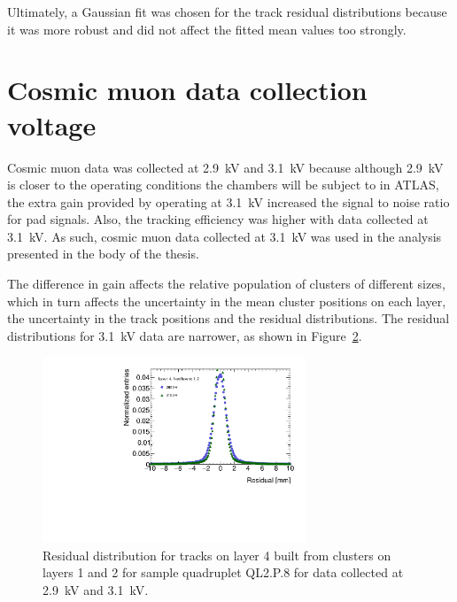 \begin{figure}
  \caption{}
  \label{fig:double_Gaussian_compare_fits}

\end{figure}
\newpage
\restoregeometry

Ultimately, a Gaussian fit was chosen for the track residual distributions because it was more robust and did not affect the fitted mean values too strongly.

\section{Cosmic muon data collection voltage}
\label{appendix:systematics_2900V_vs_3100V}


Cosmic muon data was collected at 2.9~kV and 3.1~kV because although 2.9~kV is closer to the operating conditions the chambers will be subject to in ATLAS, the extra gain provided by operating at 3.1~kV increased the signal to noise ratio for pad signals. Also, the tracking efficiency was higher with data collected at 3.1~kV. As such, cosmic muon data collected at 3.1~kV was used in the analysis presented in the body of the thesis.

The difference in gain affects the relative population of clusters of different sizes, which in turn affects the uncertainty in the mean cluster positions on each layer, the uncertainty in the track positions and the residual distributions. The residual distributions for 3.1~kV data are narrower, as shown in Figure~\ref{fig:res_dist_2900V_3100V_412}.

\begin{figure}
    \centering
    \includegraphics[width = 0.7\textwidth]{figures/figure_residual_distributions_blue_QL2P08_2900V_2021-05-21_green_QL2P08_3100V_2021-05-21_layer4_fixedlayers12.pdf}
    \caption{Residual distribution for tracks on layer 4 built from clusters on layers 1 and 2 for sample quadruplet QL2.P.8 for data collected at 2.9~kV and 3.1~kV.}
    \label{fig:res_dist_2900V_3100V_412}
\end{figure}

